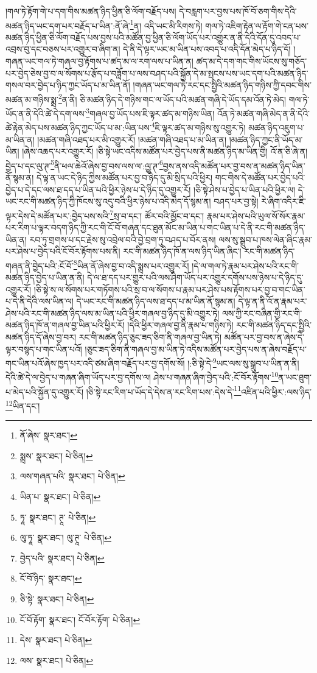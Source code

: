 །གལ་ཏེ་རྟོག་གེ་པ་དག་གིས་མཚན་ཉིད་ཕྱིན་ཅི་ལོག་བརྗོད་པས། དེ་བརླག་པར་བྱས་པས་ཁོ་བོ་ཅག་གིས་དེའི་མཚན་ཉིད་ཡང་དག་པར་བརྗོད་པ་ཡིན་:ནོ་ཞེ་\footnote{ནོ་ཞེས་  སྣར་ཐང་། }ན། འདི་ཡང་མི་རིགས་ཏེ། གལ་ཏེ་འཇིག་རྟེན་ལ་རྟོག་གེ་ངན་པས་མཚན་ཉིད་ཕྱིན་ཅི་ལོག་བརྗོད་པས་བྱས་པའི་མཚོན་བྱ་ཕྱིན་ཅི་ལོག་ཡོད་པར་འགྱུར་ན་ནི་དེའི་དོན་དུ་འབད་པ་འབྲས་བུ་དང་བཅས་པར་འགྱུར་བ་ཞིག་ན། དེ་ནི་དེ་ལྟར་ཡང་མ་ཡིན་པས་འབད་པ་འདི་དོན་མེད་པ་ཉིད་དོ། །གཞན་ཡང་གལ་ཏེ་གཞལ་བྱ་རྟོགས་པ་ཚད་མ་ལ་རག་ལས་པ་ཡིན་ན། ཚད་མ་དེ་དག་གང་གིས་ཡོངས་སུ་གཅོད་པར་བྱེད་ཅེས་བྱ་བ་ལ་སོགས་པ་རྩོད་པ་བཟློག་པ་ལས་བཤད་པའི་སྐྱོན་དེ་མ་སྤངས་པས་ཡང་དག་པའི་མཚན་ཉིད་གསལ་བར་བྱེད་པ་ཉིད་ཀྱང་ཡོད་པ་མ་ཡིན་ནོ། །གཞན་ཡང་གལ་ཏེ་རང་དང་སྤྱིའི་མཚན་ཉིད་གཉིས་ཀྱི་དབང་གིས་མཚན་མ་གཉིས་སྨྲ་\footnote{སྨྲས་  སྣར་ཐང་།  པེ་ཅིན། }ན་ནི། ཅི་མཚན་ཉིད་དེ་གཉིས་གང་ལ་ཡོད་པའི་མཚན་གཞི་དེ་ཡོད་དམ་འོན་ཏེ་མེད། གལ་ཏེ་ཡོད་ན་ནི་དེའི་ཚེ་དེ་དག་ལས་\footnote{ལས་གཞན་པའི་  སྣར་ཐང་།  པེ་ཅིན། }གཞལ་བྱ་ཡོད་པས་ཇི་ལྟར་ཚད་མ་གཉིས་ཡིན། འོན་ཏེ་མཚན་གཞི་མེད་ན་ནི་དེའི་ཚེ་རྟེན་མེད་པས་མཚན་ཉིད་ཀྱང་ཡོད་པ་མ་:ཡིན་པས་\footnote{ཡིན་པ་  སྣར་ཐང་།  པེ་ཅིན། }ཇི་ལྟར་ཚད་མ་གཉིས་སུ་འགྱུར་ཏེ། མཚན་ཉིད་འཇུག་པ་མ་ཡིན་ན། །མཚན་གཞི་འཐད་པར་མི་འགྱུར་རོ། །མཚན་གཞི་འཐད་པ་མ་ཡིན་ན། །མཚན་ཉིད་ཀྱང་ནི་ཡོད་མ་ཡིན། །ཞེས་འཆད་པར་འགྱུར་རོ། །ཅི་སྟེ་ཡང་འདིས་མཚོན་པར་བྱེད་པས་ནི་མཚན་ཉིད་མ་ཡིན་གྱི། འོ་ན་ཅི་ཞེ་ན། བྱེད་པ་དང་ལུ་ཊ་\footnote{ཏཱ་  སྣར་ཐང་། ཊཱ་  པེ་ཅིན། }ནི་ཕལ་ཆེའོ་ཞེས་བྱ་བས་ལས་ལ་:ལྱུ་ཊ་\footnote{ལུ་ཏཱ་  སྣར་ཐང་། ལུ་ཊཱ་  པེ་ཅིན། }བྱས་ནས་འདི་མཚོན་པར་བྱ་བས་ན་མཚན་ཉིད་ཡིན་ནོ་སྙམ་ན། དེ་ལྟ་ན་ཡང་དེ་ཉིད་ཀྱིས་མཚོན་པར་བྱ་བ་ཉིད་དུ་མི་སྲིད་པའི་ཕྱིར། གང་གིས་དེ་མཚོན་པར་བྱེད་པའི་བྱེད་པ་དེ་དང་ལས་ཐ་དད་པ་ཡིན་པའི་ཕྱིར་ཉེས་པ་དེ་ཉིད་དུ་འགྱུར་རོ། །ཅི་སྟེ་ཤེས་པ་བྱེད་པ་ཡིན་པའི་ཕྱིར་ལ། དེ་ཡང་རང་གི་མཚན་ཉིད་ཀྱི་ཁོངས་སུ་འདུ་བའི་ཕྱིར་ཉེས་པ་འདི་མེད་དོ་སྙམ་ན། བཤད་པར་བྱ་སྟེ། རེ་ཞིག་འདིར་ཇི་ལྟར་དེས་དེ་མཚོན་པར་:བྱེད་པས་སའི་\footnote{བྱེད་པའི་  སྣར་ཐང་།  པེ་ཅིན། }སྲ་བ་དང་། ཚོར་བའི་མྱོང་བ་དང་། རྣམ་པར་ཤེས་པའི་ཡུལ་སོ་སོར་རྣམ་པར་རིག་པ་ལྟར་བདག་ཉིད་ཀྱི་རང་གི་ངོ་བོ་གཞན་དང་ཐུན་མོང་མ་ཡིན་པ་གང་ཡིན་པ་དེ་ནི་རང་གི་མཚན་ཉིད་ཡིན་ན། རབ་ཏུ་གྲགས་པ་དང་རྗེས་སུ་འབྲེལ་བའི་བྱེ་བྲག་ཏུ་བཤད་པ་བོར་ནས། ལས་སུ་སྒྲུབ་པ་ཁས་ལེན་ཞིང་རྣམ་པར་ཤེས་པ་བྱེད་པའི་ངོ་བོར་རྟོགས་པས་ནི། རང་གི་མཚན་ཉིད་ཁོ་ན་ལས་ཉིད་ཡིན་ཞིང་། རང་གི་མཚན་ཉིད་གཞན་ནི་བྱེད་པའི་:ངོ་བོ་\footnote{ངོ་བོ་ཉིད་  སྣར་ཐང་། }ཡིན་ནོ་ཞེས་བྱ་བ་འདི་སྨྲས་པར་འགྱུར་རོ། །དེ་ལ་གལ་ཏེ་རྣམ་པར་ཤེས་པའི་རང་གི་མཚན་ཉིད་བྱེད་པ་ཡིན་ན་ནི། དེ་ལ་ཐ་དད་པར་གྱུར་པའི་ལས་ཤིག་ཡོད་པར་འགྱུར་དགོས་པས་ཉེས་པ་དེ་ཉིད་དུ་འགྱུར་རོ། །ཅི་སྟེ་ས་ལ་སོགས་པར་གཏོགས་པའི་སྲ་བ་ལ་སོགས་པ་རྣམ་པར་ཤེས་པས་རྟོགས་པར་བྱ་བ་གང་ཡིན་པ་དེ་ནི་དེའི་ལས་ཡིན་ལ། དེ་ཡང་རང་གི་མཚན་ཉིད་ལས་ཐ་དད་པ་མ་ཡིན་ནོ་སྙམ་ན། དེ་ལྟ་ན་ནི་འོ་ན་རྣམ་པར་ཤེས་པའི་རང་གི་མཚན་ཉིད་ལས་མ་ཡིན་པའི་ཕྱིར་གཞལ་བྱ་ཉིད་དུ་མི་འགྱུར་ཏེ། ལས་ཀྱི་རང་བཞིན་གྱི་རང་གི་མཚན་ཉིད་ཁོ་ན་གཞལ་བྱ་ཡིན་པའི་ཕྱིར་རོ། །དེའི་ཕྱིར་གཞལ་བྱ་ནི་རྣམ་པ་གཉིས་ཏེ། རང་གི་མཚན་ཉིད་དང་སྤྱིའི་མཚན་ཉིད་དོ་ཞེས་བྱ་བར། རང་གི་མཚན་ཉིད་ཅུང་ཟད་ཅིག་ནི་གཞལ་བྱ་ཡིན་ཏེ། མཚོན་པར་བྱ་བས་ན་ཞེས་དེ་ལྟར་བསྙད་པ་གང་ཡིན་པའོ། །ཅུང་ཟད་ཅིག་ནི་གཞལ་བྱ་མ་ཡིན་ཏེ་འདིས་མཚོན་པར་བྱེད་པས་ན་ཞེས་བརྗོད་པ་གང་ཡིན་པའོ་ཞེས་ཁྱད་པར་འདི་ཙམ་ཞིག་བརྗོད་པར་བྱ་དགོས་སོ། །:ཅི་སྟེ་དེ་\footnote{ཅི་སྟེ་  སྣར་ཐང་།  པེ་ཅིན། }ཡང་ལས་སུ་སྒྲུབ་པ་ཡིན་ན་ནི། དེའི་ཚེ་དེ་ལ་བྱེད་པ་གཞན་ཞིག་ཡོད་པར་བྱ་དགོས་ལ། ཤེས་པ་གཞན་ཞིག་བྱེད་པའི་:ངོ་བོར་རྟོགས་\footnote{ངོ་བོ་རྟོག་  སྣར་ཐང་། ངོ་བོར་རྟོག་  པེ་ཅིན། }ན་ཡང་ཐུག་པ་མེད་པའི་སྐྱོན་དུ་འགྱུར་རོ། །ཅི་སྟེ་རང་རིག་པ་ཡོད་དེ་དེས་ན་རང་རིག་པས་:དེས་དེ་\footnote{དེས་  སྣར་ཐང་།  པེ་ཅིན། }འཛིན་པའི་ཕྱིར་:ལས་ཉིད་\footnote{ལས་  སྣར་ཐང་།  པེ་ཅིན། }ཡིན་དང་། 